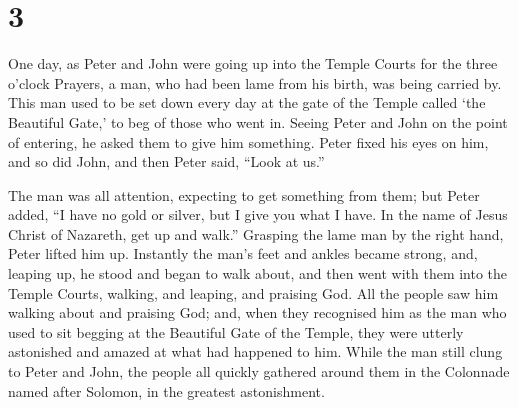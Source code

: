 \hypertarget{section-2}{%
\section{3}\label{section-2}}

 One day, as Peter and John were going up into the Temple
Courts for the three o'clock Prayers, a man, who had been lame from his
birth, was being carried by.  This man used to be set down
every day at the gate of the Temple called `the Beautiful Gate,' to beg
of those who went in.  Seeing Peter and John on the point of
entering, he asked them to give him something.  Peter fixed
his eyes on him, and so did John, and then Peter said, ``Look at us.''

 The man was all attention, expecting to get something from
them;  but Peter added, ``I have no gold or silver, but I
give you what I have. In the name of Jesus Christ of Nazareth, get up
and walk.''  Grasping the lame man by the right hand, Peter
lifted him up. Instantly the man's feet and ankles became strong,
 and, leaping up, he stood and began to walk about, and then
went with them into the Temple Courts, walking, and leaping, and
praising God.  All the people saw him walking about and
praising God;  and, when they recognised him as the man who
used to sit begging at the Beautiful Gate of the Temple, they were
utterly astonished and amazed at what had happened to him. 
While the man still clung to Peter and John, the people all quickly
gathered around them in the Colonnade named after Solomon, in the
greatest astonishment.

